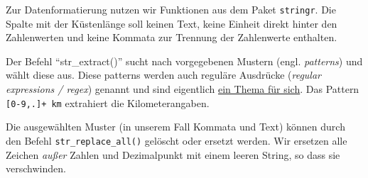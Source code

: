 \documentclass[
  ngerman,
]{article}
\newenvironment{Shaded}{\begin{snugshade}}{\end{snugshade}}
\newcommand{\FunctionTok}[1]{\textcolor[rgb]{0.00,0.00,0.00}{#1}}
\newcommand{\NormalTok}[1]{#1}
\newcommand{\OtherTok}[1]{\textcolor[rgb]{0.56,0.35,0.01}{#1}}
\newcommand{\SpecialCharTok}[1]{\textcolor[rgb]{0.00,0.00,0.00}{#1}}
\newcommand{\StringTok}[1]{\textcolor[rgb]{0.31,0.60,0.02}{#1}}
\begin{document}
Zur Datenformatierung nutzen wir Funktionen aus dem Paket \texttt{stringr}. Die Spalte mit der Küstenlänge soll keinen Text, keine Einheit direkt hinter den Zahlenwerten und keine Kommata zur Trennung der Zahlenwerte enthalten.

Der Befehl ``str\_extract()'' sucht nach vorgegebenen Mustern (engl. \emph{patterns}) und wählt diese aus. Diese patterns werden auch reguläre Ausdrücke (\emph{regular expressions / regex}) genannt und sind eigentlich \href{https://danielfett.de/en/tutorials/tutorial-regulare-ausdrucke/}{ein Thema für sich}. Das Pattern \texttt{{[}0-9,.{]}+\ km} extrahiert die Kilometerangaben.

\begin{Shaded}
\end{Shaded}

Die ausgewählten Muster (in unserem Fall Kommata und Text) können durch den Befehl \texttt{str\_replace\_all()} gelöscht oder ersetzt werden. Wir ersetzen alle Zeichen \emph{außer} Zahlen und Dezimalpunkt mit einem leeren String, so dass sie verschwinden.
\end{document}

